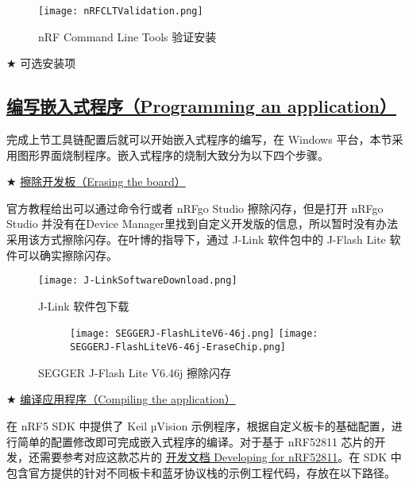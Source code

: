 \documentclass{WHUResearch}  %
\begin{document}
\begin{figure}[htbp]
\centering
  \texttt{[image: nRFCLTValidation.png]}
  \caption{nRF Command Line Tools 验证安装}
  \label{fig:nRFCLTValidation}
\end{figure}

$\bigstar$ 可选安装项

\subsection{\href{https://infocenter.nordicsemi.com/index.jsp?topic=\%2Fug_gsg_keil\%2FUG\%2Fgsg\%2Finstall_nrf5_sdk.html}{编写嵌入式程序（Programming an application）}}

完成上节工具链配置后就可以开始嵌入式程序的编写，在 Windows 平台，本节采用图形界面烧制程序。嵌入式程序的烧制大致分为以下四个步骤。

$\bigstar$ \href{https://infocenter.nordicsemi.com/index.jsp?topic=\%2Fug_gsg_keil\%2FUG\%2Fgsg\%2Ferase_board.html}{擦除开发板（Erasing the board）}

官方教程给出可以通过命令行或者 nRFgo Studio 擦除闪存，但是打开 nRFgo Studio 并没有在Device Manager里找到自定义开发版的信息，所以暂时没有办法采用该方式擦除闪存。在叶博的指导下，通过 J-Link 软件包中的 J-Flash Lite 软件可以确实擦除闪存。
\begin{figure}[htbp]
\centering
  \texttt{[image: J-LinkSoftwareDownload.png]}
  \caption{J-Link 软件包下载}
  \label{fig:J-LinkSoftwareDownload}
\end{figure}

\begin{figure}[htbp]
	\centering
	\begin{subfigure}[htbp]{1.0\textwidth}
	\centering
		\texttt{[image: SEGGERJ-FlashLiteV6-46j.png]}
		\label{fig:SEGGERJ-FlashLiteV6.46j}
		\texttt{[image: SEGGERJ-FlashLiteV6-46j-EraseChip.png]}
		\label{fig:SEGGERJ-FlashLiteV6.46j-EraseChip}
	\end{subfigure}
	\caption{SEGGER J-Flash Lite V6.46j 擦除闪存}
	\label{fig:SEGGERJ-FlashLite}
\end{figure}

$\bigstar$ \href{https://infocenter.nordicsemi.com/index.jsp?topic=\%2Fug_gsg_keil\%2FUG\%2Fgsg\%2Fcompile_keil.html}{编译应用程序（Compiling the application）}

在 nRF5 SDK 中提供了 Keil µVision 示例程序，根据自定义板卡的基础配置，进行简单的配置修改即可完成嵌入式程序的编译。对于基于 nRF52811 芯片的开发，还需要参考对应这款芯片的 \href{https://infocenter.nordicsemi.com/index.jsp?topic=\%2Fstruct_nrf52\%2Fstruct\%2Fnrf52811.html&cp=3_2}{开发文档 Developing for nRF52811}。在 SDK 中包含官方提供的针对不同板卡和蓝牙协议栈的示例工程代码，存放在以下路径。
\end{document}
